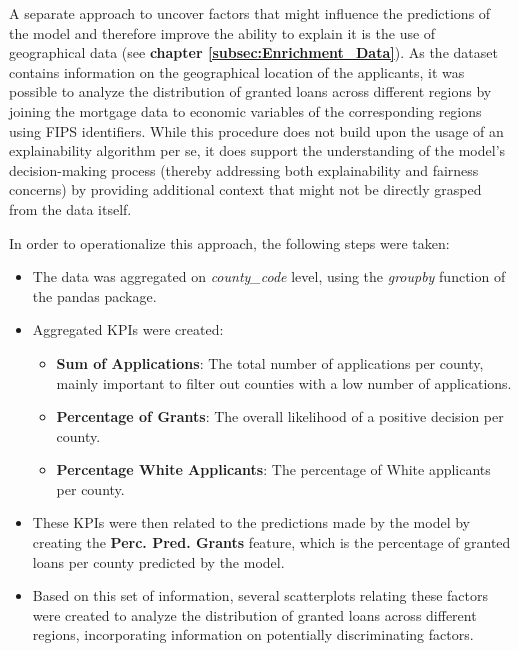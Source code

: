 A separate approach to uncover factors that might influence the predictions of the model and therefore improve the ability to explain it is the use of geographical data (see \textbf{chapter \ref{subsec:Enrichment_Data}}). As the dataset contains information on the geographical location of the applicants, it was possible to analyze the distribution of granted loans across different regions by joining the mortgage data to economic variables of the corresponding regions using FIPS identifiers. 
While this procedure does not build upon the usage of an explainability algorithm per se, it does support the understanding of the model's decision-making process (thereby addressing both explainability and fairness concerns) by providing additional context that might not be directly grasped from the data itself.

In order to operationalize this approach, the following steps were taken:
\begin{itemize}
    \item The data was aggregated on \textit{county\_code} level, using the \textit{groupby} function of the pandas package.
    \item Aggregated KPIs were created: 
    \begin{itemize}
        \item \textbf{Sum of Applications}: The total number of applications per county, mainly important to filter out counties with a low number of applications.
        \item \textbf{Percentage of Grants}: The overall likelihood of a positive decision per county.
        \item \textbf{Percentage White Applicants}: The percentage of White applicants per county.
    \end{itemize}
    \item These KPIs were then related to the predictions made by the model by creating the \textbf{Perc. Pred. Grants} feature, which is the percentage of granted loans per county predicted by the model.
    \item Based on this set of information, several scatterplots relating these factors were created to analyze the distribution of granted loans across different regions, incorporating information on potentially discriminating factors. 
\end{itemize}


